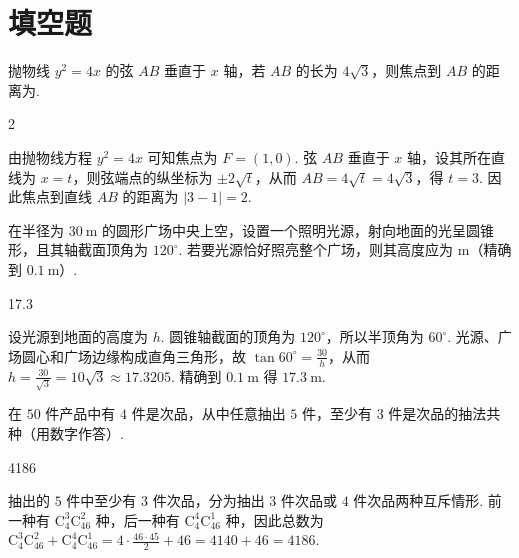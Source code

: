 \documentclass[UTF8,a4paper,oneside,11pt]{ctexbook}
\begin{document}
\section{填空题}

\begin{problem}
抛物线 \(y^2 = 4x\) 的弦 \(AB\) 垂直于 \(x\) 轴，若 \(AB\) 的长为 \(4\sqrt{3}\)，则焦点到 \(AB\) 的距离为\fillinblank{}.
\end{problem}

\begin{answer}
2
\end{answer}

\begin{solution}
由抛物线方程 \(y^2=4x\) 可知焦点为 \(F=(1,0)\). 弦 \(AB\) 垂直于 \(x\) 轴，设其所在直线为 \(x=t\)，则弦端点的纵坐标为 \(\pm2\sqrt{t}\)，从而 \(AB=4\sqrt{t}=4\sqrt{3}\)，得 \(t=3\). 因此焦点到直线 \(AB\) 的距离为 \(|3-1|=2\).
\end{solution}

\begin{problem}
在半径为 \(30\mathrm{~m}\) 的圆形广场中央上空，设置一个照明光源，射向地面的光呈圆锥形，且其轴截面顶角为 \(120^{\circ}\). 若要光源恰好照亮整个广场，则其高度应为\fillinblank{} \(\mathrm{m}\)（精确到 \(0.1\mathrm{~m}\)）.
\end{problem}

\begin{answer}
17.3
\end{answer}

\begin{solution}
设光源到地面的高度为 \(h\). 圆锥轴截面的顶角为 \(120^\circ\)，所以半顶角为 \(60^\circ\). 光源、广场圆心和广场边缘构成直角三角形，故 \(\displaystyle\tan60^\circ=\frac{30}{h}\)，从而 \(h=\frac{30}{\sqrt{3}}=10\sqrt{3}\approx17.3205\). 精确到 \(0.1\mathrm{~m}\) 得 \(17.3\mathrm{~m}\).
\end{solution}

\begin{problem}
在 \(50\) 件产品中有 \(4\) 件是次品，从中任意抽出 \(5\) 件，至少有 \(3\) 件是次品的抽法共\fillinblank{}\(\text{种}\)（用数字作答）.
\end{problem}

\begin{answer}
4186
\end{answer}

\begin{solution}
抽出的 \(5\) 件中至少有 \(3\) 件次品，分为抽出 \(3\) 件次品或 \(4\) 件次品两种互斥情形. 前一种有 \(\mathrm C_4^3\mathrm C_{46}^2\) 种，后一种有 \(\mathrm C_4^4\mathrm C_{46}^1\) 种，因此总数为 \(\displaystyle\mathrm C_4^3\mathrm C_{46}^2+\mathrm C_4^4\mathrm C_{46}^1=4\cdot\frac{46\cdot45}{2}+46=4140+46=4186\).
\end{solution}
\end{document}
